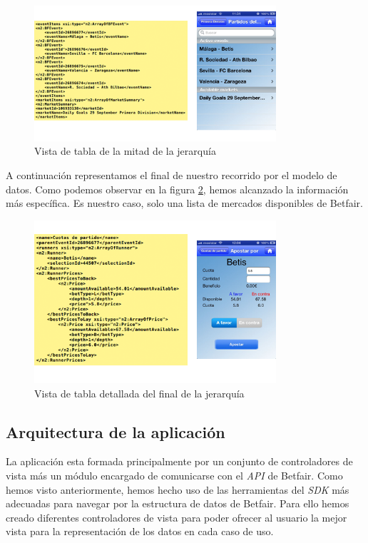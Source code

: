 \begin{figure}[ht!]
  \centering
    \includegraphics[width=0.8\textwidth]{./images/tabla_middle.png}
  \caption{Vista de tabla de la mitad de la jerarquía}
  \label{fig:table-view-middle}
\end{figure} 

 A continuación representamos el final de nuestro recorrido por el modelo de datos. Como podemos observar en la figura \ref{fig:detail-table-view}, hemos alcanzado la información más específica. Es nuestro caso, solo una lista de mercados disponibles de Betfair.

\begin{figure}[ht!]
  \centering
    \includegraphics[width=0.8\textwidth]{./images/tabla_detail.png}
  \caption{Vista de tabla detallada del final de la jerarquía }
  \label{fig:detail-table-view}
\end{figure} 

\subsection{Arquitectura de la aplicación}	
   
   La aplicación esta formada principalmente por un conjunto de controladores de vista más un módulo encargado de comunicarse con el \emph{API} de Betfair. Como hemos visto anteriormente, hemos hecho uso de las herramientas del \emph{SDK} más adecuadas para navegar por la estructura de datos de Betfair. Para ello hemos creado diferentes controladores de vista para poder ofrecer al usuario la mejor vista para la representación de los datos en cada caso de uso.%
   
